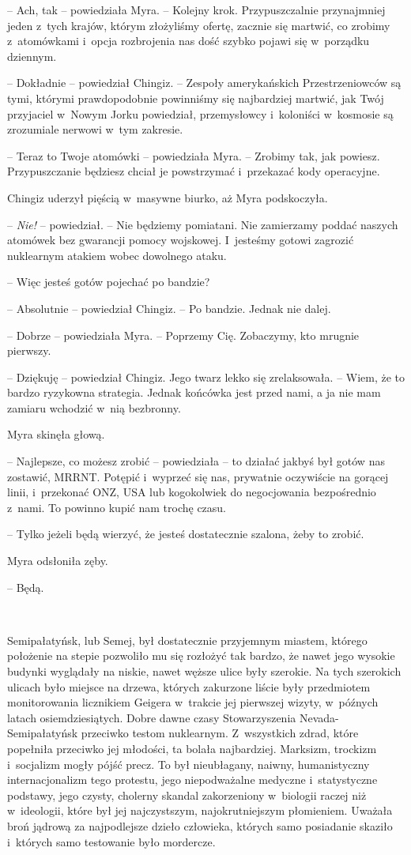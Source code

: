 \documentclass[oneside,polish,11pt,sfheadings]{mwbk}
\begin{document}
-- Ach, tak -- powiedziała Myra. -- Kolejny krok. Przypuszczalnie
przynajmniej jeden z~tych krajów, którym złożyliśmy ofertę, zacznie się
martwić, co zrobimy z~atomówkami i~opcja rozbrojenia nas dość szybko
pojawi się w~porządku dziennym.

-- Dokładnie -- powiedział Chingiz. -- Zespoły amerykańskich Przestrzeniowców
są tymi, którymi prawdopodobnie powinniśmy się najbardziej martwić, jak
Twój przyjaciel w~Nowym Jorku powiedział, przemysłowcy i~koloniści w~kosmosie są zrozumiale nerwowi w~tym zakresie.

-- Teraz to Twoje atomówki -- powiedziała Myra. -- Zrobimy tak, jak
powiesz. Przypuszczanie będziesz chciał je powstrzymać i~przekazać kody
operacyjne.

Chingiz uderzył pięścią w~masywne biurko, aż Myra podskoczyła.

-- \textit{Nie!} -- powiedział. -- Nie będziemy pomiatani. Nie zamierzamy
poddać naszych atomówek bez gwarancji pomocy wojskowej. I~jesteśmy
gotowi zagrozić nuklearnym atakiem wobec dowolnego ataku.

-- Więc jesteś gotów pojechać po bandzie?

-- Absolutnie -- powiedział Chingiz. -- Po bandzie. Jednak nie dalej.

-- Dobrze -- powiedziała Myra. -- Poprzemy Cię. Zobaczymy, kto mrugnie
pierwszy.

-- Dziękuję -- powiedział Chingiz. Jego twarz lekko się zrelaksowała. -- Wiem, że to bardzo ryzykowna strategia. Jednak końcówka jest przed nami,
a ja nie mam zamiaru wchodzić w~nią bezbronny.

Myra skinęła głową.

-- Najlepsze, co możesz zrobić -- powiedziała -- to działać jakbyś był
gotów nas zostawić, MRRNT. Potępić i~wyprzeć się nas, prywatnie
oczywiście na gorącej linii, i~przekonać ONZ, USA lub kogokolwiek do
negocjowania bezpośrednio z~nami. To powinno kupić nam trochę czasu.

-- Tylko jeżeli będą wierzyć, że jesteś dostatecznie szalona, żeby to
zrobić.

Myra odsłoniła zęby. 

-- Będą.

~

Semipałatyńsk, lub Semej, był dostatecznie przyjemnym miastem, którego
położenie na stepie pozwoliło mu się rozłożyć tak bardzo, że nawet jego
wysokie budynki wyglądały na niskie, nawet węższe ulice były szerokie.
Na tych szerokich ulicach było miejsce na drzewa, których zakurzone
liście były przedmiotem monitorowania licznikiem Geigera w~trakcie jej
pierwszej wizyty, w~późnych latach osiemdziesiątych. Dobre dawne czasy
Stowarzyszenia Nevada-Semipałatyńsk przeciwko testom nuklearnym. Z~wszystkich zdrad, które popełniła przeciwko jej młodości, ta bolała
najbardziej. Marksizm, trockizm i~socjalizm mogły pójść precz. To był
nieubłagany, naiwny, humanistyczny internacjonalizm tego protestu, jego
niepodważalne medyczne i~statystyczne podstawy, jego czysty, cholerny
skandal zakorzeniony w~biologii raczej niż w~ideologii, które był jej
najczystszym, najokrutniejszym płomieniem. Uważała broń jądrową za
najpodlejsze dzieło człowieka, których samo posiadanie skaziło i~których
samo testowanie było mordercze.
\end{document}
